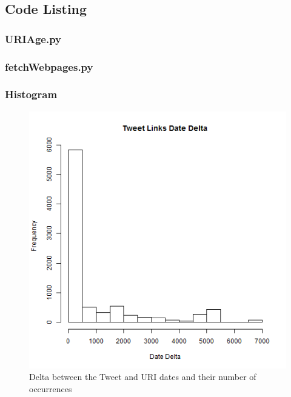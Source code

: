 \newpage

\subsection{Code Listing}
\subsubsection{URIAge.py}


\subsubsection{fetchWebpages.py}


\newpage

\subsubsection{Histogram}
\begin{figure}[ht]    
    \begin{center}
        \includegraphics[scale=0.60]{tweet-link-age-histogram.png}
        \caption{Delta between the Tweet and URI dates and their number of occurrences}
        \label{Delta between the Tweet and URI dates and their number of occurrences}
    \end{center}
\end{figure}


